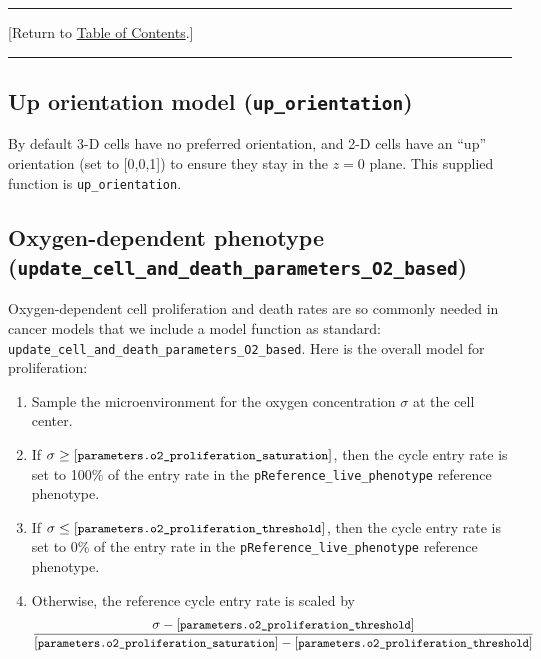 \documentclass[12pt]{article}
\newcommand{\beq}{\begin{equation}}
\newcommand{\eeq}{\end{equation}}
\renewcommand{\v}{\verb}
\renewcommand{\tt}[1]{{\small \left[\texttt{#1}\right] }}
\newcommand{\TOClink}{\begin{center}\hrule\vskip-5pt\phantom{.}\hfill[Return to \hyperlink{TOC}{Table of Contents}.]\hfill\phantom{.}\vskip3pt\hrule\end{center}}
\begin{document}
\TOClink 

\subsection{Up orientation model (\texttt{up\_orientation})}
\label{sec:Standard_Models:Orientation}
By default 3-D cells have no preferred orientation, and 2-D cells 
have an ``up'' orientation (set to [0,0,1]) to ensure they stay 
in the $z=0$ plane. This supplied function is 
\v|up_orientation|. 

\subsection{Oxygen-dependent phenotype \\
(\texttt{update\_cell\_and\_death\_parameters\_O2\_based})}
\label{sec:Standard_Models:Microenvironment_Phenotype}
Oxygen-dependent cell proliferation and death rates are so commonly 
needed in cancer models that we include a model function 
as standard: 
\v|update_cell_and_death_parameters_O2_based|. Here is the 
overall model for proliferation: 

\begin{enumerate}
\item 
Sample the microenvironment for the oxygen concentration 
$\sigma$ at the 
cell center. 
\item 
If $\sigma \ge \tt{parameters.o2\_proliferation\_saturation}$, 
then the cycle entry rate is set to 100\% of the entry rate 
in the \v|pReference_live_phenotype| reference phenotype. 

\item 
If $\sigma \le \tt{parameters.o2\_proliferation\_threshold}$, 
then the cycle entry rate is set to 0\% of the entry rate 
in the \v|pReference_live_phenotype| reference phenotype. 

\item 
Otherwise, the reference cycle entry rate is scaled by 
\beq
\frac{ \sigma - 
\tt{parameters.o2\_proliferation\_threshold} }
{ \tt{parameters.o2\_proliferation\_saturation} - 
\tt{parameters.o2\_proliferation\_threshold} }
\eeq

\end{enumerate}

%
%
%
\end{document}
